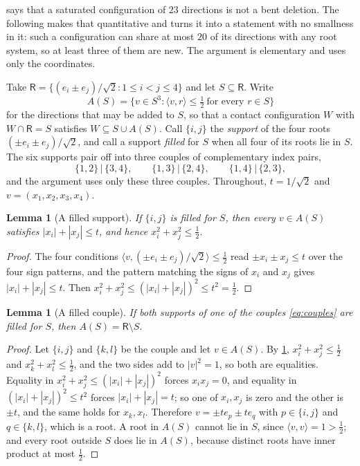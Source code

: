 \documentclass[11pt,reqno]{amsart}
\renewcommand{\_}{\origunderscore\allowbreak}
\numberwithin{equation}{section}
\theoremstyle{plain}
\newtheorem{lem}[thm]{Lemma}
\theoremstyle{definition}
\theoremstyle{remark}
\newcommand{\Rt}{\mathsf{R}}                 %
\begin{document}
 says that a saturated configuration of $23$
directions is not a bent deletion. The following makes that quantitative
and turns it into a statement with no smallness in it: such a
configuration can share at most $20$ of its directions with any root
system, so at least three of them are new. The argument is elementary and
uses only the coordinates.

Take $\Rt=\{(e_i\pm e_j)/\sqrt2:1\le i<j\le4\}$ and let $S\subseteq\Rt$.
Write
\begin{equation}\label{eq:addable-set}
  A(S)=\bigl\{v\in S^3:\langle v,r\rangle\le\tfrac12\ \text{for every }
  r\in S\bigr\}
\end{equation}
for the directions that may be added to $S$, so that a contact
configuration $W$ with $W\cap\Rt=S$ satisfies $W\subseteq S\cup A(S)$.
Call $\{i,j\}$ the \emph{support} of the four roots
$(\pm e_i\pm e_j)/\sqrt2$, and call a support \emph{filled} for $S$ when
all four of its roots lie in $S$. The six supports pair off into three
couples of complementary index pairs,
\begin{equation}\label{eq:couples}
  \{1,2\}\,\big|\,\{3,4\},
  \qquad
  \{1,3\}\,\big|\,\{2,4\},
  \qquad
  \{1,4\}\,\big|\,\{2,3\},
\end{equation}
and the argument uses only these three couples. Throughout,
$t=1/\sqrt2$ and $v=(x_1,x_2,x_3,x_4)$.

\begin{lem}[A filled support]\label{lem:filled-support}
If $\{i,j\}$ is filled for $S$, then every $v\in A(S)$ satisfies
$|x_i|+|x_j|\le t$, and hence $x_i^2+x_j^2\le\tfrac12$.
\end{lem}

\begin{proof}
The four conditions $\langle v,(\pm e_i\pm e_j)/\sqrt2\rangle\le\tfrac12$
read $\pm x_i\pm x_j\le t$ over the four sign patterns, and the pattern
matching the signs of $x_i$ and $x_j$ gives $|x_i|+|x_j|\le t$. Then
$x_i^2+x_j^2\le(|x_i|+|x_j|)^2\le t^2=\tfrac12$.
\end{proof}

\begin{lem}[A filled couple]\label{lem:filled-couple}
If both supports of one of the couples \eqref{eq:couples} are filled for
$S$, then $A(S)=\Rt\setminus S$.
\end{lem}

\begin{proof}
Let $\{i,j\}$ and $\{k,l\}$ be the couple and let $v\in A(S)$. By
\cref{lem:filled-support}, $x_i^2+x_j^2\le\tfrac12$ and
$x_k^2+x_l^2\le\tfrac12$, and the two sides add to $|v|^2=1$, so both are
equalities. Equality in $x_i^2+x_j^2\le(|x_i|+|x_j|)^2$ forces
$x_ix_j=0$, and equality in $(|x_i|+|x_j|)^2\le t^2$ forces
$|x_i|+|x_j|=t$; so one of $x_i,x_j$ is zero and the other is $\pm t$,
and the same holds for $x_k,x_l$. Therefore $v=\pm te_p\pm te_q$ with
$p\in\{i,j\}$ and $q\in\{k,l\}$, which is a root. A root in $A(S)$ cannot
lie in $S$, since $\langle v,v\rangle=1>\tfrac12$; and every root outside
$S$ does lie in $A(S)$, because distinct roots have inner product at most
$\tfrac12$.
\end{proof}
\end{document}
